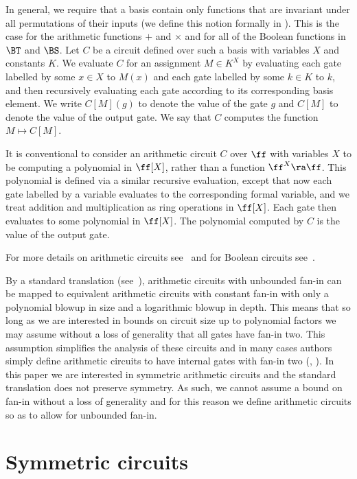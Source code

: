 \documentclass{toc}
\begin{document}
In general, we require that a basis contain only functions that are invariant
under all permutations of their inputs (we define this notion formally in
). This is the case for the arithmetic functions
$+$ and $\times$ and for all of the Boolean functions in $\BT$ and $\BS$. Let
$C$ be a circuit defined over such a basis with variables $X$ and constants $K$.
We evaluate $C$ for an assignment $M \in K^X$ by evaluating each gate labelled
by some $x \in X$ to $M(x)$ and each gate labelled by some $k \in K$ to $k$, and
then recursively evaluating each gate according to its corresponding basis
element. We write $C[M](g)$ to denote the value of the gate $g$ and $C[M]$ to
denote the value of the output gate. We say that $C$ computes the function $M
\mapsto C[M]$.

It is conventional to consider an arithmetic circuit $C$ over $\ff$ with
variables $X$ to be computing a polynomial in $\ff[X]$, rather than a function
$\ff^X \ra \ff$. This polynomial is defined via a similar recursive evaluation,
except that now each gate labelled by a variable evaluates to the corresponding
formal variable, and we treat addition and multiplication as ring operations in
$\ff[X]$. Each gate then evaluates to some polynomial in $\ff[X]$. The
polynomial computed by $C$ is the value of the output gate.

For more details on arithmetic circuits see~\cite{ShpilkaY10} and for Boolean
circuits see~\cite{Vollmer99}.

  By a standard translation (see~\cite{Valient1981}),  arithmetic circuits with unbounded
  fan-in can be mapped to equivalent arithmetic circuits with constant fan-in with only a polynomial
  blowup in size and a logarithmic blowup in depth. This means that so long as we are interested in bounds on circuit size up to polynomial factors we may assume without a loss
  of generality that all gates have fan-in two. This assumption simplifies the
  analysis of these circuits and in many cases authors simply define arithmetic
  circuits to have internal gates with fan-in two (\eg, \cite{ShpilkaY10}). In
  this paper we are interested in symmetric arithmetic circuits and
  the standard
  translation does not preserve symmetry. As such, we cannot assume a bound on
  fan-in without a loss of generality and for this reason we define arithmetic circuits so as to
  allow for unbounded fan-in.




\section{Symmetric circuits}\label{sec:symm-circ}
\end{document}
